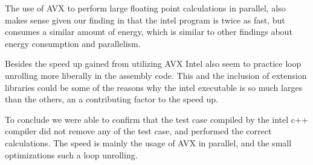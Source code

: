 The use of AVX to perform large floating point calculations in parallel, also makes sense given our finding in that the intel program is twice as fast, but consumes a similar amount of energy, which is similar to other findings about energy consumption and parallelism\cite{Lindholt2022}.

Besides the speed up gained from utilizing AVX Intel also seem to practice loop unrolling more liberally in the assembly code. This and the inclusion of extension libraries could be some of the reasons why the intel executable is so much larges than the others, an a contributing factor to the speed up.

To conclude we were able to confirm that the test case compiled by the intel c++ compiler did not remove any of the test case, and performed the correct calculations. The speed is mainly the usage of AVX in parallel, and the small optimizations such a loop unrolling.





